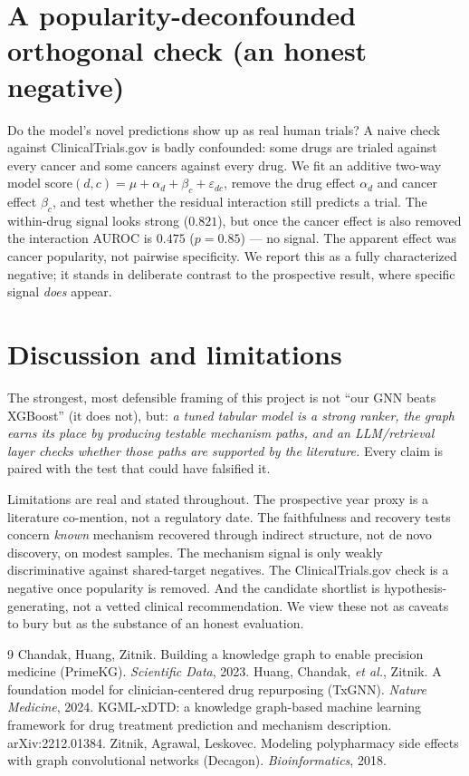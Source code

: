 \documentclass[11pt]{article}
\begin{document}
\section{A popularity-deconfounded orthogonal check (an honest negative)}\label{sec:ct}
Do the model's novel predictions show up as real human trials? A naive check against
ClinicalTrials.gov is badly confounded: some drugs are trialed against every cancer and some
cancers against every drug. We fit an additive two-way model
$\text{score}(d,c)=\mu+\alpha_d+\beta_c+\varepsilon_{dc}$, remove the drug effect $\alpha_d$
and cancer effect $\beta_c$, and test whether the residual interaction still predicts a
trial. The within-drug signal looks strong ($0.821$), but once the cancer effect is also
removed the interaction AUROC is $0.475$ ($p=0.85$) --- no signal. The apparent effect was
cancer popularity, not pairwise specificity. We report this as a fully characterized
negative; it stands in deliberate contrast to the prospective result, where specific signal
\emph{does} appear.

\section{Discussion and limitations}
The strongest, most defensible framing of this project is not ``our GNN beats XGBoost''
(it does not), but: \emph{a tuned tabular model is a strong ranker, the graph earns its place
by producing testable mechanism paths, and an LLM/retrieval layer checks whether those paths
are supported by the literature.} Every claim is paired with the test that could have
falsified it.

Limitations are real and stated throughout. The prospective year proxy is a literature
co-mention, not a regulatory date. The faithfulness and recovery tests concern \emph{known}
mechanism recovered through indirect structure, not de novo discovery, on modest samples.
The mechanism signal is only weakly discriminative against shared-target negatives. The
ClinicalTrials.gov check is a negative once popularity is removed. And the candidate
shortlist is hypothesis-generating, not a vetted clinical recommendation. We view these not
as caveats to bury but as the substance of an honest evaluation.

\begin{thebibliography}{9}
 Chandak, Huang, Zitnik. Building a knowledge graph to enable precision
medicine (PrimeKG). \emph{Scientific Data}, 2023.
 Huang, Chandak, \emph{et al.}, Zitnik. A foundation model for
clinician-centered drug repurposing (TxGNN). \emph{Nature Medicine}, 2024.
 KGML-xDTD: a knowledge graph-based machine learning framework for drug
treatment prediction and mechanism description. arXiv:2212.01384.
 Zitnik, Agrawal, Leskovec. Modeling polypharmacy side effects with graph
convolutional networks (Decagon). \emph{Bioinformatics}, 2018.
\end{thebibliography}
\end{document}
